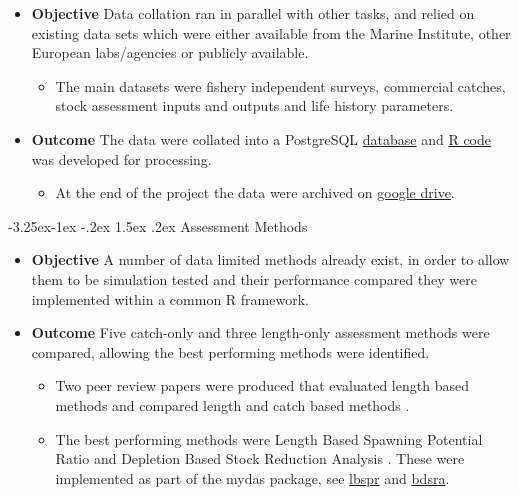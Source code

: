 \documentclass[a4paper, 10pt]{article}
\makeatletter
\renewcommand{\subsection}{\@startsection{subsection}{2}{\z@}%
 {-3.25ex\@plus -1ex \@minus -.2ex}%
 {1.5ex \@plus .2ex}%
 {\normalfont\bfseries\slshape}}
\makeatother
\begin{document}
\begin{itemize}[labelindent=\parindent,noitemsep,topsep=0pt,parsep=0pt,partopsep=0pt]
 \item \textbf{Objective} Data collation ran in parallel with other tasks, and relied on existing data sets which were either available from the Marine Institute, other European labs/agencies or publicly available. 
 \begin{itemize} \item The main datasets were fishery independent surveys, commercial catches, stock assessment inputs and outputs and life history parameters.
 \end{itemize}
 \item \textbf{Outcome} The data were collated into a PostgreSQL \hyperref[appendix:db]{database} and  \hyperref[appendix:datsets]{R code} was developed for processing. 
 \begin{itemize}
    \item At the end of the project the data were archived on \href{https://3o2y9wugzp1kfxr5hvzgzq-on.drv.tw/MyDas/db.html}{google drive}.
 \end{itemize}
\end{itemize}


\subsection{Assessment Methods}

\begin{itemize}[labelindent=\parindent,noitemsep,topsep=0pt,parsep=0pt,partopsep=0pt]
 \item \textbf{Objective} A number of data limited methods already exist, in order to allow them to be simulation tested and their performance compared they were implemented within a common R framework.    
 \item \textbf{Outcome} Five catch-only and three length-only assessment methods were compared, allowing the best performing methods were identified.  
 \begin{itemize}
  \item Two peer review papers were produced that evaluated length based methods \citep{pons2019performance} and compared length and catch based methods \citep{pons2019catchlen}.
 \item  The best performing methods were Length Based Spawning Potential Ratio \citep[LBSPR][]{hordyk2014novel} and Depletion Based  Stock Reduction Analysis \citep[DBSRA][]{dick2011depletion}. These were implemented as part of the mydas package, see \href{https://3o2y9wugzp1kfxr5hvzgzq-on.drv.tw/MyDas/tasks/4/simtest-lbspr.html}{lbspr} and
 \href{https://3o2y9wugzp1kfxr5hvzgzq-on.drv.tw/MyDas/tasks/4/simtest-bdsra.html}{bdsra}.
 \end{itemize}
\end{itemize}
\end{document}
